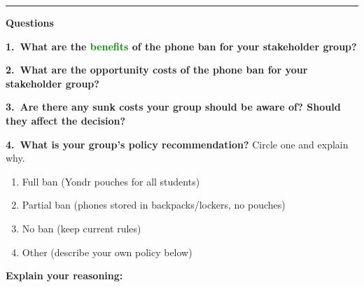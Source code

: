\documentclass[letterpaper,10pt]{article}
\begin{document}
\vspace{1em}
\hrule
\vspace{0.8em}

{\large\textbf{Questions}}

\vspace{0.8em}

\textbf{1.\ What are the \textcolor{green}{benefits} of the phone ban for your stakeholder group?}

\vspace{4cm}

\textbf{2.\ What are the \textcolor{vermillion}{opportunity costs} of the phone ban for your stakeholder group?}

\vspace{4cm}

\textbf{3.\ Are there any \textbf{sunk costs} your group should be aware of? Should they affect the decision?}

\vspace{3cm}

\textbf{4.\ What is your group's \textbf{policy recommendation}?} Circle one and explain why.

\vspace{0.3em}
\begin{enumerate}[label=\alph*)]
  \item Full ban (Yondr pouches for all students)
  \item Partial ban (phones stored in backpacks/lockers, no pouches)
  \item No ban (keep current rules)
  \item Other (describe your own policy below)
\end{enumerate}

\vspace{0.3em}
\textbf{Explain your reasoning:}

\vspace{4cm}
\end{document}
